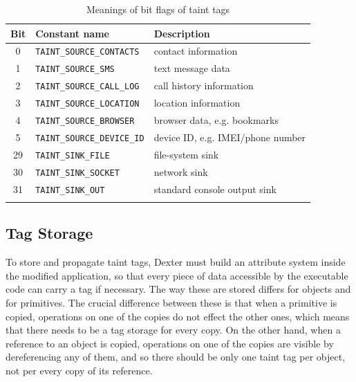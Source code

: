 \documentclass[12pt,twoside,notitlepage]{report}
\begin{document}
\begin{table}
	\begin{center}
	\begin{tabular}{|c|l|l|}
		\firsthline
		\textbf{Bit} & \textbf{Constant name}        & \textbf{Description} \\
		\hline
		0            & \verb$TAINT_SOURCE_CONTACTS$  & contact information \\
		1            & \verb$TAINT_SOURCE_SMS$       & text message data \\
		2            & \verb$TAINT_SOURCE_CALL_LOG$  & call history information \\
		3            & \verb$TAINT_SOURCE_LOCATION$  & location information \\
		4            & \verb$TAINT_SOURCE_BROWSER$   & browser data, e.g. bookmarks \\
		5            & \verb$TAINT_SOURCE_DEVICE_ID$ & device ID, e.g. IMEI/phone number \\
		\hline
		29           & \verb$TAINT_SINK_FILE$        & file-system sink \\
		30           & \verb$TAINT_SINK_SOCKET$      & network sink \\
		31           & \verb$TAINT_SINK_OUT$         & standard console output sink \\
		\lasthline
	\end{tabular}
	\end{center}
	\caption{Meanings of bit flags of taint tags}
	\label{table:TaintTagStorage_BitMeaning}
\end{table}

\subsection{Tag Storage}

To store and propagate taint tags, Dexter must build an attribute system inside the modified application, so that every piece of data accessible by the executable code can carry a tag if necessary. The way these are stored differs for objects and for primitives. The crucial difference between these is that when a primitive is copied, operations on one of the copies do not effect the other ones, which means that there needs to be a tag storage for every copy. On the other hand, when a reference to an object is copied, operations on one of the copies are visible by dereferencing any of them, and so there should be only one taint tag per object, not per every copy of its reference. 
\end{document}
